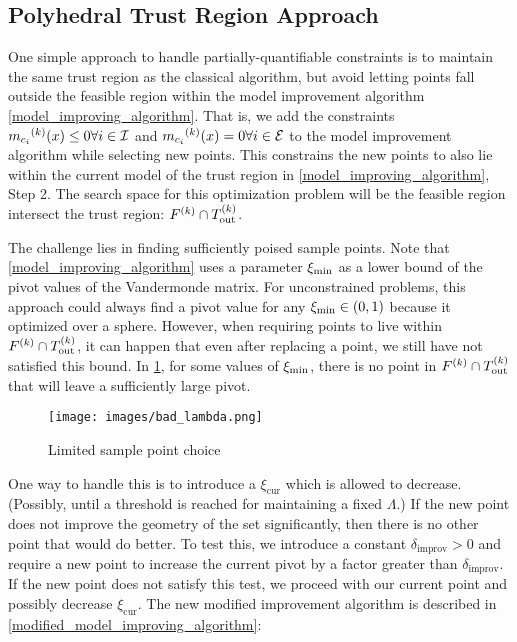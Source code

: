 \subsection{Polyhedral Trust Region Approach}
One simple approach to handle partially-quantifiable constraints is to maintain the same trust region as the classical algorithm, but avoid letting points fall outside the feasible region within the model improvement algorithm \cref{model_improving_algorithm}.
That is, we add the constraints ${{m}_{c_i}}^{(k)}(x) \le 0 \forall i \in \mathcal{I}$ and ${{m}_{c_i}}^{(k)}(x) = 0 \forall i \in \mathcal{E}$ to the model improvement algorithm while selecting new points.
This constrains the new points to also lie within the current model of the trust region in \cref{model_improving_algorithm}, Step 2.
The search space for this optimization problem will be the feasible region intersect the trust region: ${F}^{(k)} \cap {T_{\text{out}}^{(k)}} $.

The challenge lies in finding sufficiently poised sample points.
Note that \cref{model_improving_algorithm} uses a parameter $  \xi_{\text{min}} $ as a lower bound of the pivot values of the Vandermonde matrix.
For unconstrained problems, this approach could always find a pivot value for any $ \xi_{\text{min}} \in (0,1)$ because it optimized over a sphere.
However, when requiring points to live within $ {F}^{(k)} \cap {T_{\text{out}}^{(k)}} $, it can happen that even after replacing a point, we still have not satisfied this bound.
In \cref{lspc}, for some values of $  \xi_{\text{min}} $, there is no point in $ {F}^{(k)} \cap {T_{\text{out}}^{(k)}} $ that will leave a sufficiently large pivot.

\begin{figure}[h]
    \centering
    \texttt{[image: images/bad\_lambda.png]}
    \caption{Limited sample point choice}
    \label{lspc}
\end{figure}


One way to handle this is to introduce a $\xi_{\text{cur}}$ which is allowed to decrease.
(Possibly, until a threshold is reached for maintaining a fixed $\Lambda$.)
If the new point does not improve the geometry of the set significantly, then there is no other point that would do better.
To test this, we introduce a constant $\delta_{\text{improv}}>0$ and require a new point to increase the current pivot by a factor greater than $\delta_{\text{improv}}$.
If the new point does not satisfy this test, we proceed with our current point and possibly decrease $\xi_{\text{cur}}$.
The new modified improvement algorithm is described in \cref{modified_model_improving_algorithm}:


